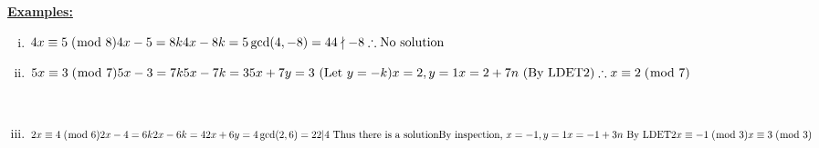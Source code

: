 \documentclass{letter}
\begin{document}
	\vspace{0.25 in}
			
	\underline{\textbf{Examples:}}
	\vspace{0.25 in}
	
	\begin{minipage}[t]{0.5\textwidth}
		\begin{enumerate}[i)]
	  		\item 
	  		\begin{math}
	  			4x \equiv 5\;(\bmod\; 8)\\
	  			4x - 5 = 8k\\
	  			4x - 8k = 5\\
	  			\gcd(4, -8) = 4\\
	  			4 \nmid -8\\
	  			\therefore \text{No solution}
	  		\end{math}
		\end{enumerate}
	\end{minipage}
	\begin{minipage}[t]{0.5\textwidth}
		\begin{enumerate}[i)]
			\setcounter{enumi}{1}
			\item
	        \begin{math}
			  	5x \equiv 3\;(\bmod\; 7)\\
			  	5x - 3 = 7k\\
			  	5x - 7k = 3\\
			  	5x + 7y = 3  \text{ (Let }y = -k)\\
			  	x=2, y=1\\
			  	x = 2 + 7n \text{ (By LDET2)}\\
			  	\therefore x \equiv 2\;(\bmod\; 7)  
			\end{math}
		\end{enumerate}
	\end{minipage}\\
	\clearpage
	\begin{enumerate}[i)]
		\setcounter{enumi}{2}
		\item
		\begin{math}
			2x \equiv 4 \;(\bmod \;6)\\
			2x - 4 = 6k\\
			2x - 6k = 4\\
			2x + 6y = 4\\
			\gcd(2, 6) = 2\\
			2 \vert 4 \text{ Thus there is a solution}\\
			\text{By inspection, } x=-1, y=1\\
			x = -1 + 3n \text{ By LDET2}\\
			x \equiv -1 \;(\bmod\; 3)\\
			x \equiv 3 \;(\bmod\; 3)
		\end{math}
	\end{enumerate}
\end{document}
